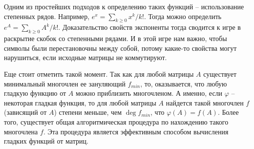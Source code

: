 Одним из простейших подходов к определению таких функций -- использование степенных рядов. Например, $e^x = \sum_{k\geqslant 0} x^k/k!$. Тогда можно определить $e^A = \sum_{k\geqslant 0} A^k/k!$. Доказательство свойств экспоненты тогда сводится к игре в раскрытие скобок со степенными рядами. И в этой игре нам важно, чтобы символы были перестановочны между собой, потому какие-то свойства могут нарушиться, если исходные матрицы не коммутируют.

Еще стоит отметить такой момент. Так как для любой матрицы $A$ существует минимальный многочлен ее зануляющий $f_{min}$, то, оказывается, что любую гладкую функцию от $A$ можно приблизить многочленом. А именно, если $\varphi$ -- некоторая гладкая функция, то для любой матрицы $A$ найдется такой многочлен $f$ (зависящий от $A$) степени меньше, чем $\deg f_{min}$, что $\varphi(A) = f(A)$. Более того, существует общая алгоритмическая процедура по нахождению такого многочлена $f$. Эта процедура является эффективным способом вычисления гладких функций от матриц.
